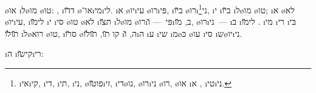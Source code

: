  \o{או} \i{ל}\o{מו} \o{טו}:  ,  \i{ד}\u{דו}  \o{או}־\i{מי}\i{לי}. \i{א}   \o{יו}\i{עי}  \o{רו}\i{פּי}, \i{ב}\u{יו} \o{רו}\i{ני}\footnote{\i{אי}\i{קי}, \i{די}, \i{תי}, \i{ני}, \o{פו}\u{טו}\i{זי}, \i{די}\o{נו}, \o{רו}\i{ני} \o{רו}, \o{או} \i{א} , \i{טי}\i{ני}.}, \i{י}   \i{ב}\u{יו} \i{ל}\o{מו} \o{טו}; \i{א}  \o{לא} \o{יו}\i{עי}, \i{לי}\u{מו}  \i{י}  \i{סי} \o{טו} \o{לא}  \i{ת}\u{צו} \i{ל}\o{מו}  \o{רו}\i{פּי}~— \u{ו}\i{ב}, \u{מו}, \o{רו}\i{ני}~—  \i{ב} \i{לי}\u{מו}  . \i{מי} \i{רי} \i{בּי} \u{תו}\u{לו} \i{ל}\o{רוא} \o{טו},  \i{ס}\u{רו} \o{קו}  \u{תו}, \u{תו}\u{לו} \i{ה},  \u{ו}\i{ה} \i{ע} \i{שי} \i{מ}\o{כּ}  \o{עו}  \i{סי} \i{ש}\o{יו}\i{ני}. 

\i{ה}  \i{קי}\u{שו}\i{רי}:

\newcommand{\epoqr}[1]{\texttt{[image: texts/images/wikipedia-esperanto-url-\#1.png]}}
\newcommand{\epourl}[3]{\small%
	\raisebox{2ex-\height}{\epoqr{#1}}\hspace{1em}
	\begin{minipage}[t]{0.8\linewidth}{\url{#2}\newline #3}\end{minipage}\vspace{3ex}\\
}

